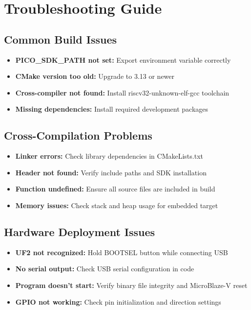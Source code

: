 \documentclass[11pt,a4paper]{article}
\begin{document}
\section{Troubleshooting Guide}

\subsection{Common Build Issues}
\begin{itemize}
    \item \textbf{PICO\_SDK\_PATH not set:} Export environment variable correctly
    \item \textbf{CMake version too old:} Upgrade to 3.13 or newer
    \item \textbf{Cross-compiler not found:} Install riscv32-unknown-elf-gcc toolchain
    \item \textbf{Missing dependencies:} Install required development packages
\end{itemize}

\subsection{Cross-Compilation Problems}
\begin{itemize}
    \item \textbf{Linker errors:} Check library dependencies in CMakeLists.txt
    \item \textbf{Header not found:} Verify include paths and SDK installation
    \item \textbf{Function undefined:} Ensure all source files are included in build
    \item \textbf{Memory issues:} Check stack and heap usage for embedded target
\end{itemize}

\subsection{Hardware Deployment Issues}
\begin{itemize}
    \item \textbf{UF2 not recognized:} Hold BOOTSEL button while connecting USB
    \item \textbf{No serial output:} Check USB serial configuration in code
    \item \textbf{Program doesn't start:} Verify binary file integrity and MicroBlaze-V reset
    \item \textbf{GPIO not working:} Check pin initialization and direction settings
\end{itemize}
\end{document}
